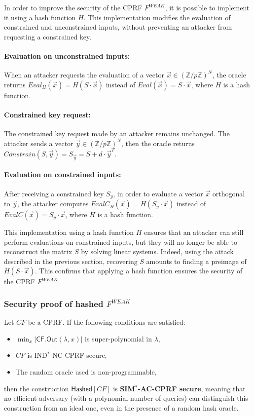 \documentclass[9pt]{extarticle}
\begin{document}
In order to improve the security of the CPRF $F^{WEAK}$, it is possible to implement it using a hash function $H$. This implementation modifies the evaluation of constrained and unconstrained inputs, without preventing an attacker from requesting a constrained key.

\paragraph{Evaluation on unconstrained inputs: }When an attacker requests the evaluation of a vector $\vec{x} \in (\mathbb{Z}/p\mathbb{Z})^N$, the oracle returns $Eval_H(\vec{x}) = H(S \cdot \vec{x})$ instead of $Eval(\vec{x}) = S \cdot \vec{x}$, where $H$ is a hash function.

\paragraph{Constrained key request: }The constrained key request made by an attacker remains unchanged. The attacker sends a vector $\vec{y} \in (\mathbb{Z}/p\mathbb{Z})^N$, then the oracle returns $Constrain(S, \vec{y}) = S_{\vec{y}} = S + d \cdot \vec{y}^T$.

\paragraph{Evaluation on constrained inputs: }After receiving a constrained key $S_y$, in order to evaluate a vector $\vec{x}$ orthogonal to $\vec{y}$, the attacker computes $EvalC_H(\vec{x}) = H(S_y \cdot \vec{x})$ instead of $EvalC(\vec{x}) = S_y \cdot \vec{x}$, where $H$ is a hash function.

This implementation using a hash function $H$ ensures that an attacker can still perform evaluations on constrained inputs, but they will no longer be able to reconstruct the matrix $S$ by solving linear systems. Indeed, using the attack described in the previous section, recovering $S$ amounts to finding a preimage of $H(S \cdot \vec{x})$. This confirms that applying a hash function ensures the security of the CPRF $F^{WEAK}$.


\subsubsection{Security proof of hashed $F^{WEAK}$}


\begin{defbox}{}
Let $CF$ be a CPRF. If the following conditions are satisfied:
\begin{itemize}
    \item $\min_x |\textsf{CF.Out}(\lambda, x)|$ is super-polynomial in $\lambda$,
    \item $CF$ is IND$^*$-NC-CPRF secure,
    \item The random oracle used is non-programmable,
\end{itemize}
then the construction $\textsf{Hashed}[CF]$ is \textbf{SIM$^*$-AC-CPRF secure},
meaning that no efficient adversary (with a polynomial number of queries)
can distinguish this construction from an ideal one, even in the presence of a random hash oracle.
\end{defbox}
\end{document}
